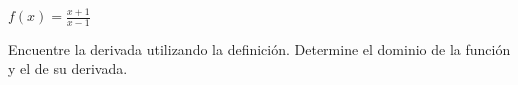\item $f(x) = \frac{x + 1}{x - 1}$
\par
Encuentre la derivada utilizando la definición. Determine el dominio de la función y el de su derivada.
